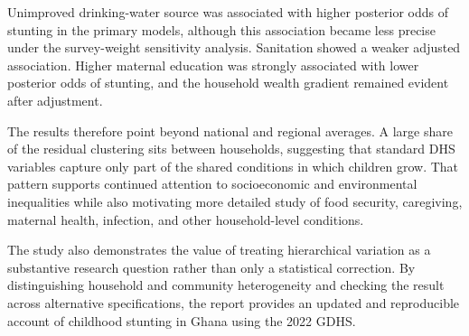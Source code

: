Unimproved drinking-water source was associated with higher posterior odds of stunting in the primary models, although this association became less precise under the survey-weight sensitivity analysis. Sanitation showed a weaker adjusted association. Higher maternal education was strongly associated with lower posterior odds of stunting, and the household wealth gradient remained evident after adjustment.

The results therefore point beyond national and regional averages. A large share of the residual clustering sits between households, suggesting that standard DHS variables capture only part of the shared conditions in which children grow. That pattern supports continued attention to socioeconomic and environmental inequalities while also motivating more detailed study of food security, caregiving, maternal health, infection, and other household-level conditions.

The study also demonstrates the value of treating hierarchical variation as a substantive research question rather than only a statistical correction. By distinguishing household and community heterogeneity and checking the result across alternative specifications, the report provides an updated and reproducible account of childhood stunting in Ghana using the 2022 GDHS.
